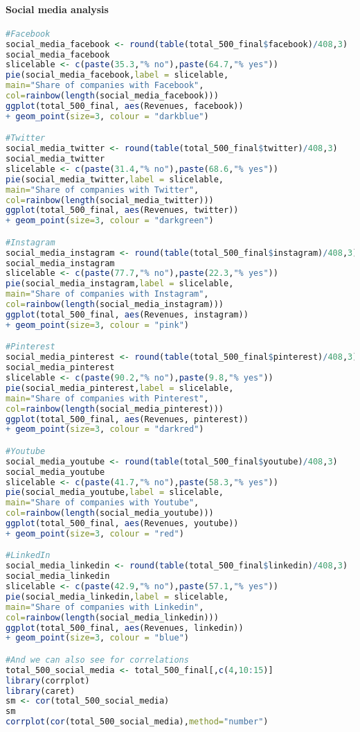 \documentclass{article}
\begin{document}
\paragraph{Social media analysis}\label{r: van: sm}
\begin{lstlisting}[language=R] 
#Facebook
social_media_facebook <- round(table(total_500_final$facebook)/408,3)
social_media_facebook
slicelable <- c(paste(35.3,"% no"),paste(64.7,"% yes"))
pie(social_media_facebook,label = slicelable,
main="Share of companies with Facebook",
col=rainbow(length(social_media_facebook)))
ggplot(total_500_final, aes(Revenues, facebook)) 
+ geom_point(size=3, colour = "darkblue")

#Twitter
social_media_twitter <- round(table(total_500_final$twitter)/408,3)
social_media_twitter
slicelable <- c(paste(31.4,"% no"),paste(68.6,"% yes"))
pie(social_media_twitter,label = slicelable,
main="Share of companies with Twitter",
col=rainbow(length(social_media_twitter)))
ggplot(total_500_final, aes(Revenues, twitter)) 
+ geom_point(size=3, colour = "darkgreen")

#Instagram
social_media_instagram <- round(table(total_500_final$instagram)/408,3)
social_media_instagram
slicelable <- c(paste(77.7,"% no"),paste(22.3,"% yes"))
pie(social_media_instagram,label = slicelable,
main="Share of companies with Instagram",
col=rainbow(length(social_media_instagram)))
ggplot(total_500_final, aes(Revenues, instagram)) 
+ geom_point(size=3, colour = "pink")

#Pinterest
social_media_pinterest <- round(table(total_500_final$pinterest)/408,3)
social_media_pinterest
slicelable <- c(paste(90.2,"% no"),paste(9.8,"% yes"))
pie(social_media_pinterest,label = slicelable,
main="Share of companies with Pinterest",
col=rainbow(length(social_media_pinterest)))
ggplot(total_500_final, aes(Revenues, pinterest)) 
+ geom_point(size=3, colour = "darkred")

#Youtube
social_media_youtube <- round(table(total_500_final$youtube)/408,3)
social_media_youtube
slicelable <- c(paste(41.7,"% no"),paste(58.3,"% yes"))
pie(social_media_youtube,label = slicelable,
main="Share of companies with Youtube",
col=rainbow(length(social_media_youtube)))
ggplot(total_500_final, aes(Revenues, youtube)) 
+ geom_point(size=3, colour = "red")

#LinkedIn
social_media_linkedin <- round(table(total_500_final$linkedin)/408,3)
social_media_linkedin
slicelable <- c(paste(42.9,"% no"),paste(57.1,"% yes"))
pie(social_media_linkedin,label = slicelable,
main="Share of companies with Linkedin",
col=rainbow(length(social_media_linkedin)))
ggplot(total_500_final, aes(Revenues, linkedin)) 
+ geom_point(size=3, colour = "blue")

#And we can also see for correlations
total_500_social_media <- total_500_final[,c(4,10:15)]
library(corrplot)
library(caret)
sm <- cor(total_500_social_media)
sm
corrplot(cor(total_500_social_media),method="number")
\end{lstlisting}
\end{document}
